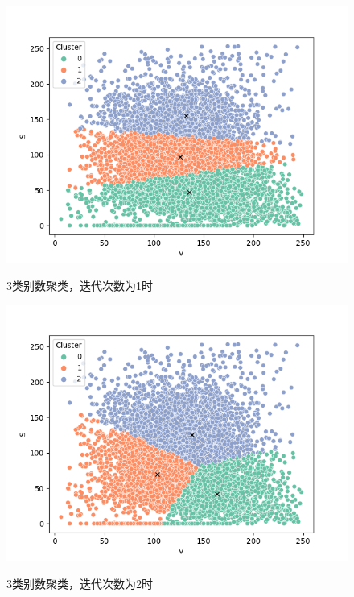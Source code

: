 \documentclass[UTF8]{ctexart}
\begin{document}
	\begin{figure}[htbp]
		\centering
		\caption{3类别数聚类，迭代次数为1时}
		\includegraphics[width=1.0\textwidth]{cluster1.png}
		\label{Fig.35}
	\end{figure}
	
	\begin{figure}[htbp]
		\centering
		\caption{3类别数聚类，迭代次数为2时}
		\includegraphics[width=1.0\textwidth]{cluster2.png}
		\label{Fig.36}
	\end{figure}
	
\end{document}
